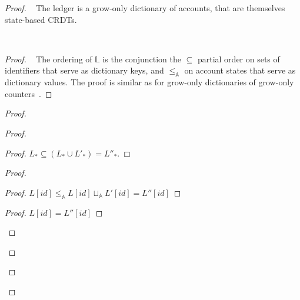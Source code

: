 \documentclass[9pt]{article}   	%
\begin{document}
\label{th:ledger-crdt}
\begin{proof}
	\pfsketch~ The ledger is a grow-only dictionary of accounts, that are themselves state-based CRDTs.

	
\pf~		
	\begin{proof}
		\pfsketch~ The ordering of $\mathds{L}$ is the conjunction the $\subseteq$ partial order on sets of identifiers that serve as dictionary keys, and $\leq_\mathds{A}$ on account states that serve as dictionary values. The proof is similar as for grow-only dictionaries of grow-only counters~\cite{lavoie2023statebased}.
	\end{proof}
	
	\begin{proof}		
		\begin{proof}
			\begin{proof}
				$L_* \subseteq (L_* \cup L'_*) = L''_*$.
			\end{proof}
			
			\begin{proof}
				\begin{proof}
					$ L[\textit{id}] \leq_\mathds{A} L[\textit{id}] \sqcup_\mathds{A}  L'[\textit{id}]  = L''[\textit{id}]$
				\end{proof}
				
				\begin{proof}
					$L[\textit{id}] = L''[\textit{id}]$
				\end{proof}
			\end{proof}
			

\end{proof}
\end{proof}
\end{proof}
\end{document}
